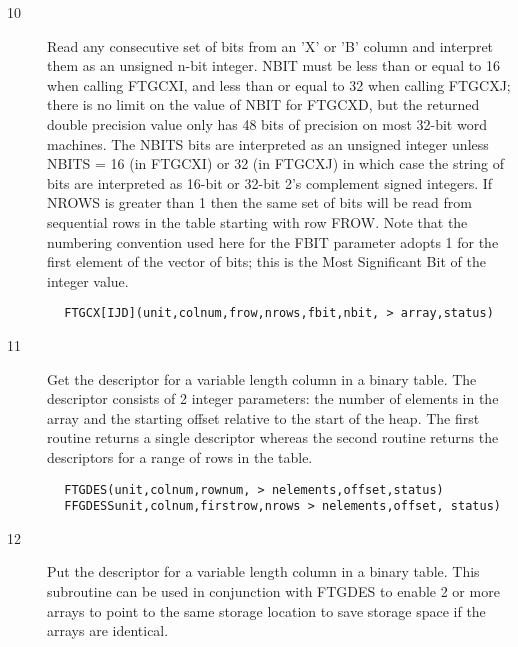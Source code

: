 \documentclass[11pt]{book}
\begin{document}
\begin{description}
\item[10] Read any consecutive set of bits from an 'X' or 'B' column and
    interpret them as an unsigned n-bit integer. NBIT must be less than
    or equal to 16 when calling FTGCXI, and less than or equal to 32 when
    calling FTGCXJ; there is no limit on the value of NBIT for FTGCXD, but
    the returned double precision value only has 48 bits of precision on
    most 32-bit word machines.  The NBITS bits are interpreted as an
    unsigned integer unless NBITS = 16 (in FTGCXI) or 32 (in FTGCXJ) in which
    case the string of bits are interpreted as 16-bit or 32-bit 2's
    complement signed integers.  If NROWS is greater than 1 then the
    same set of bits will be read from sequential rows in the table
    starting with row FROW.  Note that the numbering convention
    used here for the FBIT parameter adopts 1 for the first element of the
   vector of bits;  this is the Most Significant Bit of the integer value.
\end{description}

\begin{verbatim}
        FTGCX[IJD](unit,colnum,frow,nrows,fbit,nbit, > array,status)
\end{verbatim}

\begin{description}
\item[11] Get the descriptor for a variable length column in a binary table.
    The descriptor consists of 2 integer parameters: the number of elements
    in the array and the starting offset relative to the start of the heap.
    The first routine returns a single descriptor whereas the second routine
   returns the descriptors for a range of rows in the table.
\end{description}

\begin{verbatim}
        FTGDES(unit,colnum,rownum, > nelements,offset,status)
        FFGDESSunit,colnum,firstrow,nrows > nelements,offset, status)
\end{verbatim}

\begin{description}
\item[12]  Put the descriptor for a variable length column in a binary table.
    This subroutine can be used in conjunction with FTGDES to enable
    2 or more arrays to point to the same storage location to save
   storage space if the arrays are identical.
\end{description}
\end{document}
